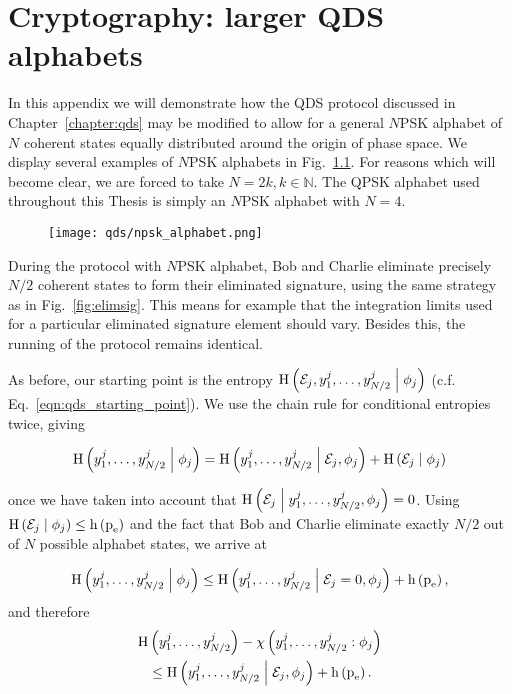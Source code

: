 \chapter{Cryptography: larger QDS alphabets}\label{appendix:qds_larger_alphabets}

In this appendix we will demonstrate how the QDS protocol discussed in Chapter~\ref{chapter:qds} may be modified to allow for a general $N$PSK alphabet of $N$ coherent states equally distributed around the origin of phase space. We display several examples of $N$PSK alphabets in Fig.~\ref{fig:appendix_npsk}. For reasons which will become clear, we are forced to take $N = 2 k, k \in \mathbb{N}$. The QPSK alphabet used throughout this Thesis is simply an $N$PSK alphabet with $N=4$.

\begin{figure}[htp]
\captionsetup{width=0.8\linewidth}
\centering
\texttt{[image: qds/npsk\_alphabet.png]}
\caption{\label{fig:appendix_npsk} }
\end{figure}

During the protocol with $N$PSK alphabet, Bob and Charlie eliminate precisely $N/2$ coherent states to form their eliminated signature, using the same strategy as in Fig.~\ref{fig:elimsig}. This means for example that the integration limits used for a particular eliminated signature element should vary. Besides this, the running of the protocol remains identical.

As before, our starting point is the entropy $\text{H}\left( \mathcal{E}_j, y_1^j, \dots, y_{N/2}^j \; \middle| \; \phi_j \right)$ (c.f. Eq.~\ref{eqn:qds_starting_point}). We use the chain rule for conditional entropies twice, giving

\begin{equation}
\text{H}\left(y_1^j, \dots, y_{N/2}^j \; \middle| \; \phi_j\right) = \text{H}\left(y_1^j, \dots, y_{N/2}^j \; \middle| \; \mathcal{E}_j, \phi_j \right) + \text{H}\left(\mathcal{E}_j \; \middle| \; \phi_j\right)
\end{equation}

\noindent once we have taken into account that $\text{H}\left(\mathcal{E}_j \; \middle| \; y_1^j, \dots, y_{N/2}^j, \phi_j \right)=0$. Using $\text{H}\left(\mathcal{E}_j \; \middle| \; \phi_j \right) \le \text{h}\left(\text{p}_{\text{e}}\right)$ and the fact that Bob and Charlie eliminate exactly $N/2$ out of $N$ possible alphabet states, we arrive at

\begin{equation}
\text{H}\left(y_1^j, \dots, y_{N/2}^j \; \middle| \; \phi_j\right) \le \text{H}\left(y_1^j, \dots, y_{N/2}^j\; \middle| \; \mathcal{E}_j = 0, \phi_j\right) + \text{h}\left(\text{p}_{\text{e}}\right),
\end{equation}
and therefore
\begin{align}
\text{H}&\left(y_1^j, \dots, y_{N/2}^j\right) - \chi\left(y_1^j, \dots, y_{N/2}^j : \phi_j\right) \notag \\
%
& \le \text{H}\left(y_1^j, \dots, y_{N/2}^j \given \mathcal{E}_j, \phi_j\right) + \text{h}\left(\pe\right).
\end{align}

